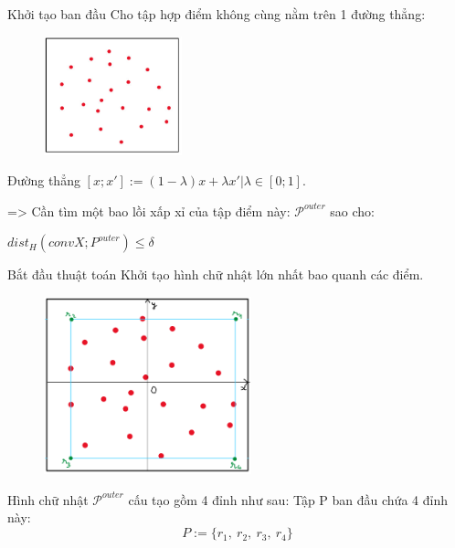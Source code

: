 \documentclass[11pt]{beamer}
\theoremstyle{definition}
\theoremstyle{plain}
\theoremstyle{plain}
\theoremstyle{remark}
\begin{document}
	
	\begin{frame}{Khởi tạo ban đầu}
		Cho tập hợp điểm không cùng nằm trên 1 đường thẳng:
		\begin{figure}
			\begin{center}
				\includegraphics[width=4cm]{./initial_sub_point.jpg}
			\end{center}
		\end{figure}
		\begin{center}
			Đường thẳng $[x; x'] := {(1 - \lambda)x + \lambda x' | \lambda \in [0; 1]}$.\\
		\end{center}
		=> Cần tìm một bao lồi xấp xỉ của tập điểm này: $\mathcal{P}^{outer}$ sao cho: 
		\begin{center}
			$dist_H(conv X; P^{outer}) \leq \delta$
		\end{center}
		
	\end{frame}
	\begin{frame}{Bắt đầu thuật toán}
		Khởi tạo hình chữ nhật lớn nhất bao quanh các điểm.
		\begin{figure}
			
			\includegraphics[width=6cm]{khoi_tao_hcn_bao_quanh}
		\end{figure}
	\end{frame}
	\begin{frame}
		Hình chữ nhật $\mathcal{P}^{outer}$ cấu tạo gồm 4 đỉnh như sau:
		Tập P ban đầu chứa 4 đỉnh này:\\
		\begin{equation}\label{def_4r-2}
			P := \{r_1,\ r_2,\ r_3,\ r_4\}
		\end{equation}
	\end{frame}
\end{document}
